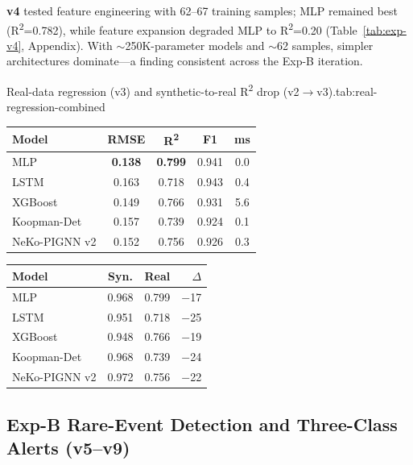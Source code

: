 \textbf{v4} tested feature engineering with 62--67 training samples; MLP remained best (R\textsuperscript{2}=0.782), while feature expansion degraded MLP to R\textsuperscript{2}=0.20 (Table~\ref{tab:exp-v4}, Appendix). With ${\sim}$250K-parameter models and ${\sim}$62 samples, simpler architectures dominate---a finding consistent across the Exp-B iteration.

\begin{resulttable}{Real-data regression (v3) and synthetic-to-real R\textsuperscript{2} drop (v2$\rightarrow$v3).}{tab:real-regression-combined}
\begin{minipage}[t]{0.48\linewidth}
\begin{tabular}{@{}lcccc@{}}
\toprule
\textbf{Model} & \textbf{RMSE} & \textbf{R\textsuperscript{2}} & \textbf{F1} & \textbf{ms} \\
\midrule
MLP & \textbf{0.138} & \textbf{0.799} & 0.941 & 0.0 \\
LSTM & 0.163 & 0.718 & 0.943 & 0.4 \\
XGBoost & 0.149 & 0.766 & 0.931 & 5.6 \\
Koopman-Det & 0.157 & 0.739 & 0.924 & 0.1 \\
NeKo-PIGNN v2 & 0.152 & 0.756 & 0.926 & 0.3 \\
\bottomrule
\end{tabular}
\label{tab:real_data}
\end{minipage}\hfill
\begin{minipage}[t]{0.48\linewidth}
\begin{tabular}{@{}lccr@{}}
\toprule
\textbf{Model} & \textbf{Syn.} & \textbf{Real} & \textbf{$\Delta$} \\
\midrule
MLP & 0.968 & 0.799 & $-$17 \\
LSTM & 0.951 & 0.718 & $-$25 \\
XGBoost & 0.948 & 0.766 & $-$19 \\
Koopman-Det & 0.968 & 0.739 & $-$24 \\
NeKo-PIGNN v2 & 0.972 & 0.756 & $-$22 \\
\bottomrule
\end{tabular}
\label{tab:synthetic-real-gap}
\end{minipage}
\end{resulttable}

\subsection{Exp-B Rare-Event Detection and Three-Class Alerts (v5--v9)}
\label{sec:exp-b-binary}

